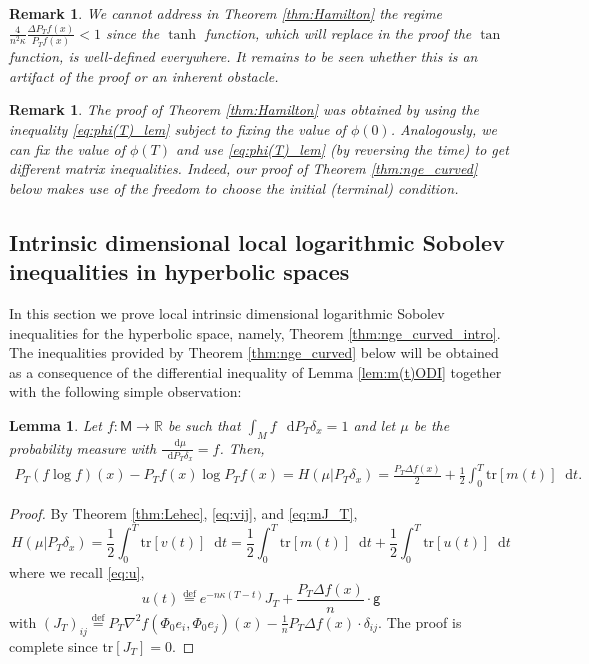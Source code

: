 \documentclass[a4paper,twoside,11pt,reqno]{amsart}
\newcommand{\eqdef}{\stackrel{\mathrm{def}}{=}}
\newtheorem{lemma}[theorem]{Lemma}
\newtheorem{remark}[theorem]{Remark}
\newcommand*\diff{\mathop{}\!\mathrm{d}}
\newcommand{\R}{\mathbb{R}} %
\newcommand{\MM}{\mathsf{M}}
\newcommand{\GG}{\mathsf{g}}
\newcommand{\mr}{\mathrm}
\begin{document}
\begin{remark}
We cannot address in Theorem \ref{thm:Hamilton} the regime $\frac{4}{n^2\kappa}\frac{\Delta P_Tf(x)}{P_Tf(x)}<1$ since the $\tanh$ function, which will replace in the proof the $\tan$ function, is well-defined everywhere. It remains to be seen whether this is an artifact of the proof or an inherent obstacle. 
\end{remark}

\begin{remark}
The proof of Theorem \ref{thm:Hamilton} was obtained by using the inequality \eqref{eq:phi(T)_lem} subject to fixing the value of $\phi(0)$.  Analogously, we can fix the value of $\phi(T)$ and use  \eqref{eq:phi(T)_lem} (by reversing the time) to get different matrix inequalities. Indeed, our proof of Theorem \ref{thm:nge_curved} below makes use of the freedom to choose the initial (terminal) condition.
\end{remark}


\subsection{Intrinsic dimensional local logarithmic Sobolev inequalities in hyperbolic spaces}
\label{subsec:neg_curvature}
In this section we prove local intrinsic dimensional logarithmic Sobolev inequalities for the hyperbolic space, namely, Theorem \ref{thm:nge_curved_intro}. The inequalities provided by Theorem \ref{thm:nge_curved} below will be obtained as a consequence of the differential inequality of Lemma \ref{lem:m(t)ODI} together with the following simple observation:
\begin{lemma}
\label{lem:mteqivvt}
Let $f:\MM\to\R$ be such that $\int_M f\,\diff P_T\delta_x=1$
and let $\mu$ be the probability measure with $\frac{\diff\mu}{\diff P_T\delta_x}=f$.  Then,
\begin{align}
\label{eq:mteqivvt}
P_T(f\log f)(x)-P_Tf(x)\log P_Tf(x)=H(\mu|P_T\delta_x)=\frac{ P_T\Delta f(x)}{2}+\frac{1}{2}\int_0^T\mr{tr}[m(t)]\diff t.
\end{align}
\end{lemma}
\begin{proof}
By Theorem \ref{thm:Lehec}, \eqref{eq:vij}, and \eqref{eq:mJ_T},
\begin{equation}
\label{eq:Hmv}
H(\mu|P_T\delta_x)=\frac{1}{2}\int_0^T\mr{tr}[v(t)]\diff t=\frac{1}{2}\int_0^T\mr{tr}[m(t)]\diff t+\frac{1}{2}\int_0^T\mr{tr}[u(t)]\diff t
\end{equation}
where we recall \eqref{eq:u},
\begin{equation}
\label{eq:u1}
u(t)\eqdef e^{-n\kappa(T-t)}J_T+\frac{P_T\Delta f(x)}{n}\cdot\GG
\end{equation}
with $(J_T)_{ij} \eqdef P_T\nabla^2 f(\Phi_0 e_i, \Phi_0 e_j)(x) - \frac{1}{n} P_T \Delta f(x)\cdot \delta_{ij}$. The proof is complete since $\mr{tr}[J_T]=0$.
\end{proof}
\end{document}
